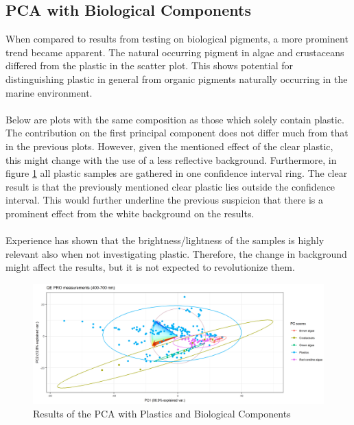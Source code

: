 \subsection{PCA with Biological Components}
When compared to results from testing on biological pigments, a more prominent trend became apparent. The natural occurring pigment in algae and crustaceans differed from the plastic in the scatter plot. This shows potential for distinguishing plastic in general from organic pigments naturally occurring in the marine environment.
\\\\%
Below are plots with the same composition as those which solely contain plastic. The contribution on the first principal component does not differ much from that in the previous plots. However, given the mentioned effect of the clear plastic, this might change with the use of a less reflective background. Furthermore, in figure \ref{fig:PCA_plastics_and_biology_scat} all plastic samples are gathered in one confidence interval ring. The clear result is that the previously mentioned clear plastic lies outside the confidence interval. This would further underline the previous suspicion that there is a prominent effect from the white background on the results.
\\\\
Experience has shown that the brightness/lightness of the samples is highly relevant also when not investigating plastic. Therefore, the change in background might affect the results, but it is not expected to revolutionize them.

\begin{figure}[H]
    \centering
    \includegraphics[width=1\textwidth]{Images/results/PCA_plastics_and_biology_scat_clust.png}
    \caption{Results of the PCA with Plastics and Biological Components}
    \label{fig:PCA_plastics_and_biology_scat}
\end{figure}


